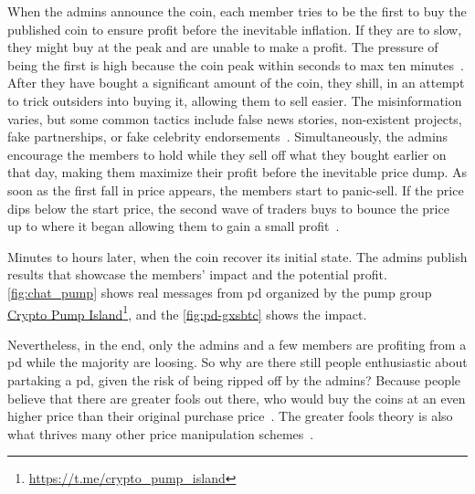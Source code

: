 When the admins announce the coin, each member tries to be the first to buy the published coin to ensure profit before the inevitable inflation. If they are to slow, they might buy at the peak and are unable to make a profit. The pressure of being the first is high because the coin peak within seconds to max ten minutes~\cite{P&D_the_outline}. After they have bought a significant amount of the coin, they shill, in an attempt to trick outsiders into buying it, allowing them to sell easier. The misinformation varies, but some common tactics include false news stories, non-existent projects, fake partnerships, or fake celebrity endorsements~\cite{P&D_the_outline}. Simultaneously, the admins encourage the members to hold while they sell off what they bought earlier on that day, making them maximize their profit before the inevitable price dump. As soon as the first fall in price appears, the members start to panic-sell. If the price dips below the start price, the second wave of traders buys to bounce the price up to where it began allowing them to gain a small profit~\cite{P&D_anatomy}.

Minutes to hours later, when the coin recover its initial state. The admins publish results that showcase the members' impact and the potential profit. \autoref{fig:chat_pump} shows real messages from \ac{pd} organized by the pump group \href{https://t.me/crypto_pump_island}{Crypto Pump Island}\footnote{\url{https://t.me/crypto_pump_island}}, and the \autoref{fig:pd-gxsbtc} shows the impact.

Nevertheless, in the end, only the admins and a few members are profiting from a \ac{pd} while the majority are loosing. So why are there still people enthusiastic about partaking a \ac{pd}, given the risk of being ripped off by the admins? Because people believe that there are greater fools out there, who would buy the coins at an even higher price than their original purchase price~\cite{P&D_anatomy}. The greater fools theory is also what thrives many other price manipulation schemes~\cite{dissecting}.

